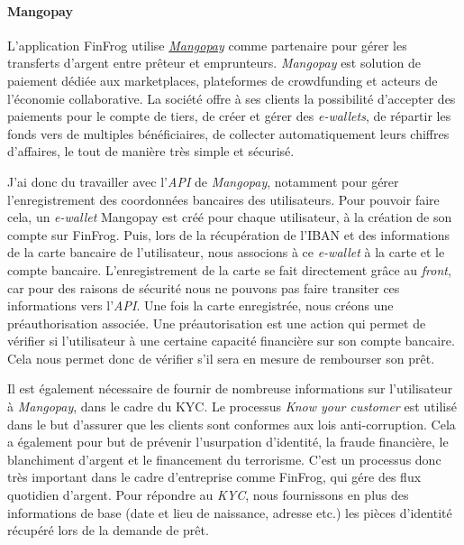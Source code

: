 \documentclass[12pt,a4paper]{article}
\begin{document}
  \paragraph{Mangopay}\label{mangopay}

  L'application FinFrog utilise
  \href{https://www.mangopay.com/fr/}{\emph{Mangopay}} comme partenaire
  pour gérer les transferts d'argent entre prêteur et emprunteurs.
  \emph{Mangopay} est solution de paiement dédiée aux marketplaces,
  plateformes de crowdfunding et acteurs de l'économie collaborative. La
  société offre à ses clients la possibilité d'accepter des paiements pour
  le compte de tiers, de créer et gérer des \emph{e-wallets}, de répartir
  les fonds vers de multiples bénéficiaires, de collecter automatiquement
  leurs chiffres d'affaires, le tout de manière très simple et sécurisé.

  \bigskip

  J'ai donc du travailler avec l'\emph{API} de \emph{Mangopay}, notamment
  pour gérer l'enregistrement des coordonnées bancaires des utilisateurs.
  Pour pouvoir faire cela, un \emph{e-wallet} Mangopay est créé pour
  chaque utilisateur, à la création de son compte sur FinFrog. Puis, lors
  de la récupération de l'IBAN et des informations de la carte bancaire de
  l'utilisateur, nous associons à ce \emph{e-wallet} à la carte et le
  compte bancaire. L'enregistrement de la carte se fait directement grâce
  au \emph{front}, car pour des raisons de sécurité nous ne pouvons pas
  faire transiter ces informations vers l'\emph{API}. Une fois la carte
  enregistrée, nous créons une préauthorisation associée. Une
  préautorisation est une action qui permet de vérifier si l'utilisateur à
  une certaine capacité financière sur son compte bancaire. Cela nous
  permet donc de vérifier s'il sera en mesure de rembourser son prêt.

  \bigskip

  Il est également nécessaire de fournir de nombreuse informations sur
  l'utilisateur à \emph{Mangopay}, dans le cadre du KYC. Le processus
  \emph{Know your customer} est utilisé dans le but d'assurer que les
  clients sont conformes aux lois anti-corruption. Cela a également pour
  but de prévenir l'usurpation d'identité, la fraude financière, le
  blanchiment d'argent et le financement du terrorisme. C'est un processus
  donc très important dans le cadre d'entreprise comme FinFrog, qui gére
  des flux quotidien d'argent. Pour répondre au \emph{KYC}, nous
  fournissons en plus des informations de base (date et lieu de naissance,
  adresse etc.) les pièces d'identité récupéré lors de la demande de prêt.
\end{document}
